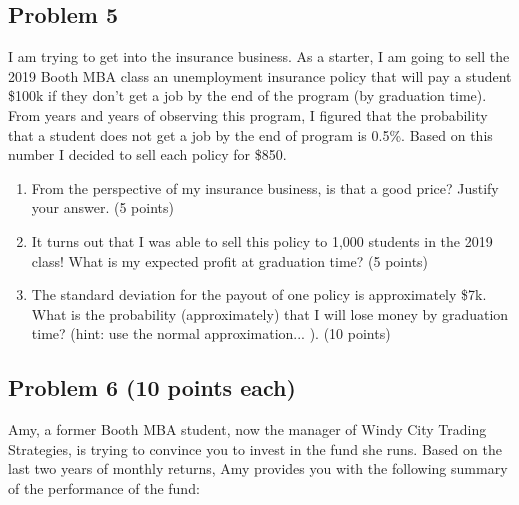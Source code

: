 \documentclass[12pt]{article}
\begin{document}
\newpage




\subsection*{Problem 5} 

\vspace{0.5cm}

I am trying to get into the insurance business. As a starter, I am going to sell the 2019 Booth MBA class an unemployment insurance policy that will pay a student \$100k if they don't get a job by the end of the program (by graduation time). From years and years of observing this program, I figured that the probability that a student does not get a job by the end of program is 0.5\%. Based on this number I decided to sell each policy for \$850.

\vspace{0.1cm}



\begin{enumerate}
\item From the perspective of my insurance business, is that a good price? Justify your answer. (5 points)

\vspace{6cm}

\item It turns out that I was able to sell this policy to 1,000 students in the 2019 class! What is my expected profit at graduation time? (5 points)
\newpage 
\vspace{7cm}

\item The standard deviation for the payout of one policy is approximately \$7k. What is the probability (approximately) that I will lose money by graduation time?  (hint: use the normal approximation... ). (10 points)
\end{enumerate}


\newpage






\subsection*{Problem 6 (10 points each)}
\vskip 1cm
\noindent Amy, a former Booth MBA student, now the manager of Windy City Trading Strategies,  is trying to convince you to invest in the fund she runs. Based on the last two years of monthly returns, Amy provides you with the following summary of the performance of the fund:
\end{document}
